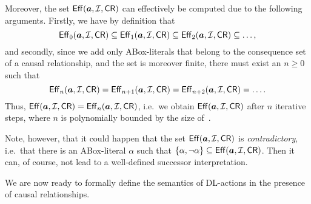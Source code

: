 \noindent
Moreover, the set $\Eff(\abf,\Imc,\CR)$ can effectively be computed due to the
following arguments.  Firstly, we have by definition that
\[\Eff_0(\abf,\Imc,\CR)\subseteq\Eff_1(\abf,\Imc,\CR)\subseteq\Eff_2(\abf,\Imc,\CR)\subseteq\dots,\]
and secondly, since we add only
ABox-literals that belong to the consequence set of a causal relationship, and
the set \CR is moreover finite, there must exist an $n\ge 0$ such that
\[\Eff_n(\abf,\Imc,\CR)=\Eff_{n+1}(\abf,\Imc,\CR)=\Eff_{n+2}(\abf,\Imc,\CR)=\dots.\]
Thus, $\Eff(\abf,\Imc,\CR)=\Eff_n(\abf,\Imc,\CR)$, i.e.~we obtain
$\Eff(\abf,\Imc,\CR)$ after $n$ iterative steps, where $n$ is polynomially
bounded by the size of~\CR.

Note, however, that it could happen that the set $\Eff(\abf,\Imc,\CR)$ is
\emph{contradictory}, i.e.~that there is an ABox-literal $\alpha$ such that
$\{\alpha,\lnot\alpha\}\subseteq\Eff(\abf,\Imc,\CR)$.  Then it can, of
course, not lead to a well-defined successor interpretation.

We are now ready to formally define the semantics of DL-actions in the presence
of causal relationships.


